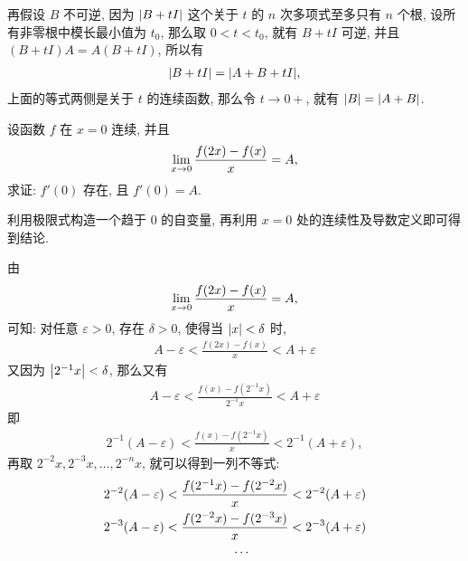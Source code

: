 \begin{exercise}[series=exer]
\begin{answer}
        再假设 $ B $ 不可逆, 因为 $ \abs{B + tI} $ 这个关于 $ t $ 的 $ n $ 次多项式至多只有 $ n $ 个根, 设所有非零根中模长最小值为 $ t_{0} $, 那么取 $ 0 < t < t_{0} $, 就有 $ B + tI $ 可逆, 并且 $ (B + tI)A = A(B + tI) $, 所以有
        \begin{align*}
            \abs{B + tI} = \abs{A + B + tI},
        \end{align*}
        上面的等式两侧是关于 $ t $ 的连续函数, 那么令 $ t \to 0+ $, 就有 $ \abs{B} = \abs{A + B} $.
    \end{answer}
    \item 设函数 $ f $ 在 $ x = 0 $ 连续, 并且
    \begin{align*}
        \lim_{x \to 0}\frac{f(2x) - f(x)}{x} = A,
    \end{align*}
    求证: $ f'(0) $ 存在, 且 $ f'(0) = A $. 
    \begin{hint}
        利用极限式构造一个趋于 $ 0 $ 的自变量, 再利用 $ x = 0 $ 处的连续性及导数定义即可得到结论.
    \end{hint}
    \begin{answer}
        由
        \begin{align*}
            \lim_{x \to 0}\frac{f(2x) - f(x)}{x} = A,
        \end{align*}
        可知: 对任意 $ \varepsilon > 0 $, 存在 $ \delta > 0 $, 使得当 $ \abs{x} < \delta $ 时, 
        \begin{align*}
            A - \varepsilon < \frac{f(2x) - f(x)}{x} < A + \varepsilon
        \end{align*}
        又因为 $ \abs{2^{-1}x} < \delta $, 那么又有
        \begin{align*}
            A - \varepsilon < \frac{f(x) - f(2^{-1}x)}{2^{-1}x} < A + \varepsilon
        \end{align*}
        即
        \begin{align*}
            2^{-1}(A - \varepsilon) < \frac{f(x) - f(2^{-1}x)}{x} < 2^{-1}(A + \varepsilon),
        \end{align*}
        再取 $ 2^{-2}x, 2^{-3}x, \dots, 2^{-n}x $, 就可以得到一列不等式: 
        \begin{align}
            2^{-2}(A - \varepsilon) & < \frac{f(2^{-1}x) - f(2^{-2}x)}{x} < 2^{-2}(A + \varepsilon) \notag\\
            2^{-3}(A - \varepsilon) & < \frac{f(2^{-2}x) - f(2^{-3}x)}{x} < 2^{-3}(A + \varepsilon) \notag\\
                                             & \phantom{< f(2^{-2}x) -}\cdots \notag\\

\end{align}
\end{answer}
\end{exercise}
